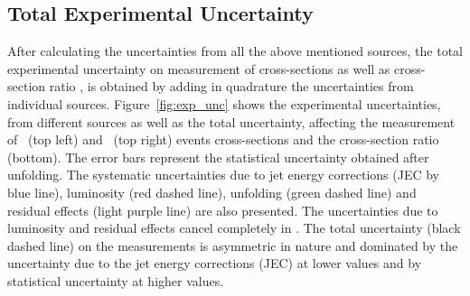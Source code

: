 \subsection{Total Experimental Uncertainty}
After calculating the uncertainties from all the above mentioned sources, the total experimental uncertainty on measurement of cross-sections as well as cross-section ratio \rations, is obtained by adding in quadrature the uncertainties from individual sources. Figure~\ref{fig:exp_unc} shows the experimental uncertainties, from different sources as well as the total uncertainty, affecting the measurement of \njt~(top left) and \njth~(top right) events cross-sections and the cross-section ratio \ratio (bottom). The error bars represent the statistical uncertainty obtained after unfolding. The systematic uncertainties due to jet energy corrections (JEC by blue line), luminosity (red dashed line), unfolding (green dashed line) and residual effects (light purple line) are also presented. The uncertainties due to luminosity and residual effects cancel completely in \ratio. The total uncertainty (black dashed line) on the measurements is asymmetric in nature and dominated by the uncertainty due to the jet energy corrections (JEC) at lower \httwo values and by statistical uncertainty at higher \httwo values. 
